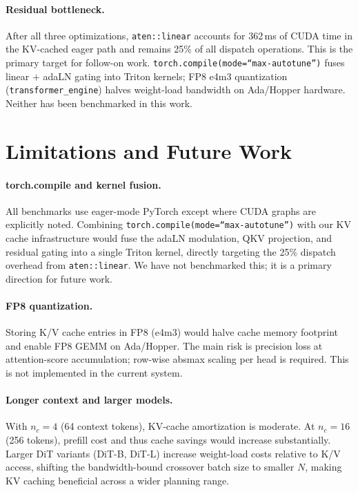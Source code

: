 \documentclass[letterpaper,twocolumn,10pt]{article}
\begin{document}
\paragraph{Residual bottleneck.}
After all three optimizations, \texttt{aten::linear} accounts for
362\,ms of CUDA time in the KV-cached eager path and remains 25\% of
all dispatch operations.  This is the primary target for follow-on
work.  \texttt{torch.compile(mode=``max-autotune'')} fuses linear $+$
adaLN gating into Triton kernels; FP8 e4m3 quantization
(\texttt{transformer\_engine}) halves weight-load bandwidth on
Ada/Hopper hardware.  Neither has been benchmarked in this work.

\section{Limitations and Future Work}

\paragraph{torch.compile and kernel fusion.}
All benchmarks use eager-mode PyTorch except where CUDA graphs are
explicitly noted.  Combining \texttt{torch.compile(mode=``max-autotune'')}
with our KV cache infrastructure would fuse the adaLN modulation,
QKV projection, and residual gating into a single Triton kernel,
directly targeting the 25\% dispatch overhead from
\texttt{aten::linear}.  We have not benchmarked this; it is a primary
direction for future work.

\paragraph{FP8 quantization.}
Storing K/V cache entries in FP8 (e4m3) would halve cache memory
footprint and enable FP8 GEMM on Ada/Hopper.  The main risk is
precision loss at attention-score accumulation; row-wise absmax
scaling per head is required.  This is not implemented in the current
system.

\paragraph{Longer context and larger models.}
With $n_c{=}4$ (64 context tokens), KV-cache amortization is
moderate.  At $n_c{=}16$ (256 tokens), prefill cost and thus cache
savings would increase substantially.  Larger DiT variants (DiT-B,
DiT-L) increase weight-load costs relative to K/V access, shifting
the bandwidth-bound crossover batch size to smaller $N$, making KV
caching beneficial across a wider planning range.
\end{document}
